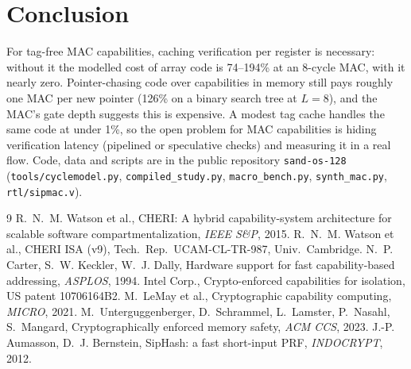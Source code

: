 \documentclass[10pt,twocolumn,a4paper]{article}
\begin{document}
\section{Conclusion}
For tag-free MAC capabilities, caching verification per register is necessary: without it the modelled cost of array code is 74--194\% at an 8-cycle MAC, with it nearly zero. Pointer-chasing code over capabilities in memory still pays roughly one MAC per new pointer (126\% on a binary search tree at $L{=}8$), and the MAC's gate depth suggests this is expensive. A modest tag cache handles the same code at under 1\%, so the open problem for MAC capabilities is hiding verification latency (pipelined or speculative checks) and measuring it in a real flow. Code, data and scripts are in the public repository \texttt{sand-os-128} (\texttt{tools/cyclemodel.py}, \texttt{compiled\_study.py}, \texttt{macro\_bench.py}, \texttt{synth\_mac.py}, \texttt{rtl/sipmac.v}).

{\footnotesize\raggedright
\begin{thebibliography}{9}\setlength{\itemsep}{0pt}\setlength{\parsep}{0pt}
 R.~N.~M. Watson et al., CHERI: A hybrid capability-system architecture for scalable software compartmentalization, \emph{IEEE S\&P}, 2015.
 R.~N.~M. Watson et al., CHERI ISA (v9), Tech.\ Rep.\ UCAM-CL-TR-987, Univ.\ Cambridge.
 N.~P. Carter, S.~W. Keckler, W.~J. Dally, Hardware support for fast capability-based addressing, \emph{ASPLOS}, 1994.
 Intel Corp., Crypto-enforced capabilities for isolation, US patent 10706164B2.
 M.~LeMay et al., Cryptographic capability computing, \emph{MICRO}, 2021.
 M.~Unterguggenberger, D.~Schrammel, L.~Lamster, P.~Nasahl, S.~Mangard, Cryptographically enforced memory safety, \emph{ACM CCS}, 2023.
 J.-P. Aumasson, D.~J. Bernstein, SipHash: a fast short-input PRF, \emph{INDOCRYPT}, 2012.
\end{thebibliography}}
\end{document}
